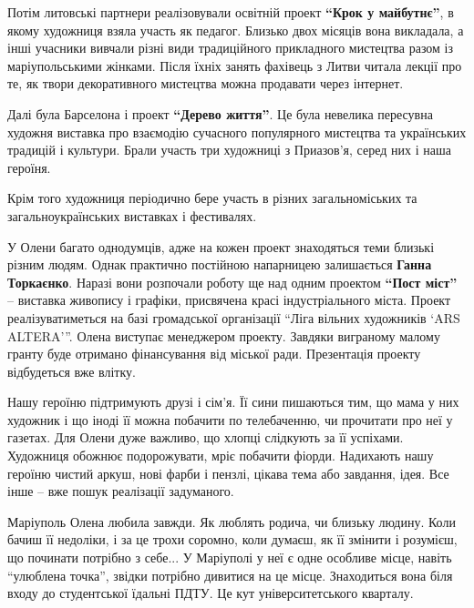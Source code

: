 Потім литовські партнери реалізовували освітній проект \textbf{\enquote{Крок у майбутнє}}, в
якому художниця взяла участь як педагог. Близько двох місяців вона викладала, а
інші учасники вивчали різні види традиційного прикладного мистецтва разом із
маріупольськими жінками. Після їхніх занять фахівець з Литви читала лекції про
те, як твори декоративного мистецтва можна продавати через інтернет.

Далі була Барселона і проект \textbf{\enquote{Дерево життя}}. Це була невелика пересувна художня
виставка про взаємодію сучасного популярного мистецтва та українських традицій
і культури. Брали участь три художниці з Приазов'я, серед них і наша героїня.

Крім того художниця періодично бере участь в різних загальноміських та
загальноукраїнських виставках і фестивалях.


У Олени багато однодумців, адже на кожен проект знаходяться теми близькі різним
людям. Однак практично постійною напарницею залишається \textbf{Ганна Торкаєнко}. Наразі
вони розпочали роботу ще над одним проектом \textbf{\enquote{Пост міст}} – виставка живопису і
графіки, присвячена красі індустріального міста. Проект реалізуватиметься на
базі громадської організації \enquote{Ліга вільних художників \enquote{ARS ALTERA}}. Олена
виступає менеджером проекту. Завдяки виграному малому гранту буде отримано
фінансування від міської ради. Презентація проекту відбудеться вже влітку.


Нашу героїню підтримують друзі і сім'я. Її сини пишаються тим, що мама у них
художник і що іноді її можна побачити по телебаченню, чи прочитати про неї у
газетах. Для Олени дуже важливо, що хлопці слідкують за її успіхами. Художниця
обожнює подорожувати, мріє побачити фіорди. Надихають нашу героїню чистий
аркуш, нові фарби і пензлі, цікава тема або завдання, ідея. Все інше – вже
пошук реалізації задуманого.

Маріуполь Олена любила завжди. Як люблять родича, чи близьку людину. Коли бачиш
її недоліки, і за це трохи соромно, коли думаєш, як її змінити і розумієш, що
починати потрібно з себе... У Маріуполі у неї є одне особливе місце, навіть
\enquote{улюблена точка}, звідки потрібно дивитися на це місце. Знаходиться вона біля
входу до студентської їдальні ПДТУ. Це кут університетського кварталу. 

